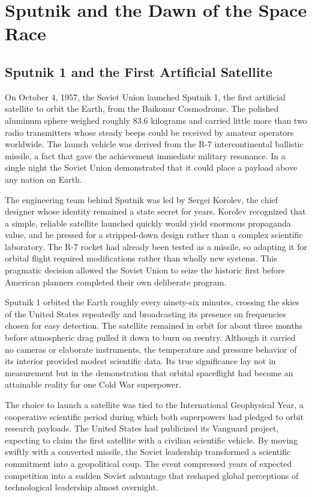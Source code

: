 \section{Sputnik and the Dawn of the Space Race}

\subsection{Sputnik 1 and the First Artificial Satellite}
On October 4, 1957, the Soviet Union launched Sputnik 1, the first artificial satellite to orbit the Earth, from the Baikonur Cosmodrome. The polished aluminum sphere weighed roughly 83.6 kilograms and carried little more than two radio transmitters whose steady beeps could be received by amateur operators worldwide. The launch vehicle was derived from the R-7 intercontinental ballistic missile, a fact that gave the achievement immediate military resonance. In a single night the Soviet Union demonstrated that it could place a payload above any nation on Earth.

The engineering team behind Sputnik was led by Sergei Korolev, the chief designer whose identity remained a state secret for years. Korolev recognized that a simple, reliable satellite launched quickly would yield enormous propaganda value, and he pressed for a stripped-down design rather than a complex scientific laboratory. The R-7 rocket had already been tested as a missile, so adapting it for orbital flight required modifications rather than wholly new systems. This pragmatic decision allowed the Soviet Union to seize the historic first before American planners completed their own deliberate program.

Sputnik 1 orbited the Earth roughly every ninety-six minutes, crossing the skies of the United States repeatedly and broadcasting its presence on frequencies chosen for easy detection. The satellite remained in orbit for about three months before atmospheric drag pulled it down to burn on reentry. Although it carried no cameras or elaborate instruments, the temperature and pressure behavior of its interior provided modest scientific data. Its true significance lay not in measurement but in the demonstration that orbital spaceflight had become an attainable reality for one Cold War superpower.

The choice to launch a satellite was tied to the International Geophysical Year, a cooperative scientific period during which both superpowers had pledged to orbit research payloads. The United States had publicized its Vanguard project, expecting to claim the first satellite with a civilian scientific vehicle. By moving swiftly with a converted missile, the Soviet leadership transformed a scientific commitment into a geopolitical coup. The event compressed years of expected competition into a sudden Soviet advantage that reshaped global perceptions of technological leadership almost overnight.

